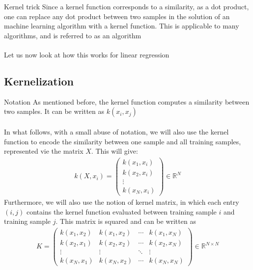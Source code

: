 \begin{parag}{Kernel trick}
    Since a kernel function corresponds to a similarity, as a dot product, one can replace any dot product between two samples in the solution of an machine learning algorithm with a kernel function. This is applicable to many algorithms, and is referred to as  an algorithm\\
	 $ $\\
	 Let us now look at how this works for linear regression
\end{parag}
\subsection{Kernelization}

\begin{parag}{Notation}
    As mentioned before, the kernel function computes a similarity between two samples. It can be written as $k\left(x_i, x_j\right)$\\
	$ $\\
	In what follows, with a small abuse of notation, we will also use the kernel function to encode the similarity between one sample and all training samples, represented vie the matrix $X$. This will give:
	\begin{align*} 
		k\left(X, x_i\right)= \begin{pmatrix} k\left(x_1, x_i\right) \\ k\left(x_2, x_i\right) \\ \vdots \\ k\left(x_N, x_i\right) \end{pmatrix} \in \mathbb{R}^{N}
	\end{align*}
	Furthermore, we will also use the notion of kernel matrix, in which each entry $\left(i, j\right)$ contains the kernel function evaluated between training sample $i$ and training sample $j$. This matrix is squared and can be written as 
	\begin{align*} 
		K = \begin{pmatrix} k\left(x_1, x_2\right) & k\left(x_1, x_2\right) & \cdots & k\left(x_1, x_N\right) \\ k\left(x_2, x_1\right) & k\left(x_2, x_2\right) & \cdots & k\left(x_2, x_N\right) \\ \vdots & \vdots & \ddots & \vdots \\ k\left(x_N, x_1\right) & k\left(x_N, x_2\right) & \cdots & k\left(x_N, x_N\right) \end{pmatrix}  \in \mathbb{R}^{N \times N}
	\end{align*}
\end{parag}

